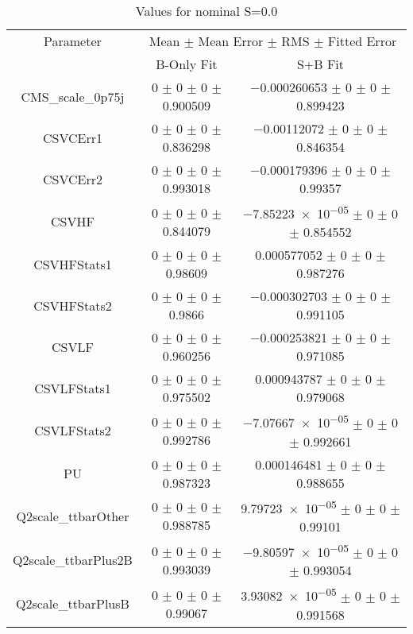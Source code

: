 \begin{table}
\centering
\caption{Values for nominal S=0.0}
\begin{tabular}{ccc}
\toprule
Parameter & \multicolumn{2}{c}{Mean $\pm$ Mean Error $\pm$ RMS $\pm$ Fitted Error}\\
 & B-Only Fit & S+B Fit\\
\midrule
CMS\_scale\_0p75j & \num{0} $\pm$ \num{0} $\pm$ \num{0} $\pm$ \num{0.900509} & \num{-0.000260653} $\pm$ \num{0} $\pm$ \num{0} $\pm$ \num{0.899423}\\
CSVCErr1 & \num{0} $\pm$ \num{0} $\pm$ \num{0} $\pm$ \num{0.836298} & \num{-0.00112072} $\pm$ \num{0} $\pm$ \num{0} $\pm$ \num{0.846354}\\
CSVCErr2 & \num{0} $\pm$ \num{0} $\pm$ \num{0} $\pm$ \num{0.993018} & \num{-0.000179396} $\pm$ \num{0} $\pm$ \num{0} $\pm$ \num{0.99357}\\
CSVHF & \num{0} $\pm$ \num{0} $\pm$ \num{0} $\pm$ \num{0.844079} & \num{-7.85223e-05} $\pm$ \num{0} $\pm$ \num{0} $\pm$ \num{0.854552}\\
CSVHFStats1 & \num{0} $\pm$ \num{0} $\pm$ \num{0} $\pm$ \num{0.98609} & \num{0.000577052} $\pm$ \num{0} $\pm$ \num{0} $\pm$ \num{0.987276}\\
CSVHFStats2 & \num{0} $\pm$ \num{0} $\pm$ \num{0} $\pm$ \num{0.9866} & \num{-0.000302703} $\pm$ \num{0} $\pm$ \num{0} $\pm$ \num{0.991105}\\
CSVLF & \num{0} $\pm$ \num{0} $\pm$ \num{0} $\pm$ \num{0.960256} & \num{-0.000253821} $\pm$ \num{0} $\pm$ \num{0} $\pm$ \num{0.971085}\\
CSVLFStats1 & \num{0} $\pm$ \num{0} $\pm$ \num{0} $\pm$ \num{0.975502} & \num{0.000943787} $\pm$ \num{0} $\pm$ \num{0} $\pm$ \num{0.979068}\\
CSVLFStats2 & \num{0} $\pm$ \num{0} $\pm$ \num{0} $\pm$ \num{0.992786} & \num{-7.07667e-05} $\pm$ \num{0} $\pm$ \num{0} $\pm$ \num{0.992661}\\
PU & \num{0} $\pm$ \num{0} $\pm$ \num{0} $\pm$ \num{0.987323} & \num{0.000146481} $\pm$ \num{0} $\pm$ \num{0} $\pm$ \num{0.988655}\\
Q2scale\_ttbarOther & \num{0} $\pm$ \num{0} $\pm$ \num{0} $\pm$ \num{0.988785} & \num{9.79723e-05} $\pm$ \num{0} $\pm$ \num{0} $\pm$ \num{0.99101}\\
Q2scale\_ttbarPlus2B & \num{0} $\pm$ \num{0} $\pm$ \num{0} $\pm$ \num{0.993039} & \num{-9.80597e-05} $\pm$ \num{0} $\pm$ \num{0} $\pm$ \num{0.993054}\\
Q2scale\_ttbarPlusB & \num{0} $\pm$ \num{0} $\pm$ \num{0} $\pm$ \num{0.99067} & \num{3.93082e-05} $\pm$ \num{0} $\pm$ \num{0} $\pm$ \num{0.991568}\\

\end{tabular}
\end{table}
